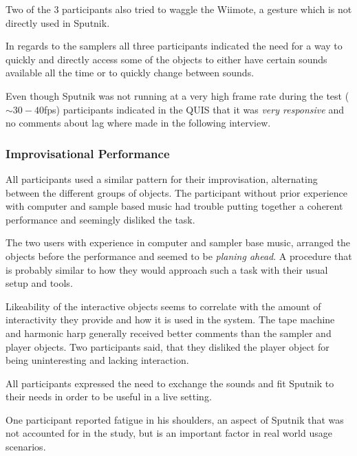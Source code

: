 \documentclass[10pt,a4paper]{scrartcl}
\begin{document}
Two of the 3 participants also tried to waggle the Wiimote, a gesture which is not directly used in Sputnik. 
 
In regards to the samplers all three participants indicated the need for a way to quickly and directly access some of the objects to either have certain sounds available all the time or to quickly change between sounds.

Even though Sputnik was not running at a very high frame rate during the test ($\sim30-40$fps) participants indicated in the QUIS that it was \emph{very responsive} and no comments about lag where made in the following interview.




\subsubsection{Improvisational Performance}
All participants used a similar pattern for their improvisation, alternating between the different groups of objects. The participant without prior experience with computer and sample based music had trouble putting together a coherent performance and seemingly disliked the task.

The two users with experience in computer and sampler base music, arranged the objects before the performance and seemed to be \emph{planing ahead}. A procedure that is probably similar to how they would approach such a task with their usual setup and tools.

Likeability of the interactive objects seems to correlate with the amount of interactivity they provide and how it is used in the system. The tape machine and harmonic harp generally received better comments than the sampler and player objects. Two participants said, that they disliked the player object for being uninteresting and lacking interaction.

All participants expressed the need to exchange the sounds and fit Sputnik to their needs in order to be useful in a live setting.

One participant reported fatigue in his shoulders, an aspect of Sputnik that was not accounted for in the study, but is an important factor in real world usage scenarios.


\end{document}
